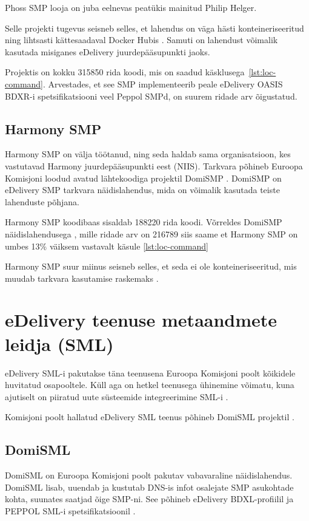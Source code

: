 Phoss SMP looja on juba eelnevas peatükis mainitud Philip Helger.

Selle projekti tugevus seisneb selles, et lahendus on väga hästi konteineriseeritud 
ning lihtsasti kättesaadaval Docker Hubis \cite{phelger_phoss_smp_xml_docker}. 
Samuti on lahendust võimalik kasutada misiganes eDelivery juurdepääsupunkti jaoks.

Projektis on kokku 315850 rida koodi, mis on saadud käsklusega~\ref{lst:loc-command}.
Arvestades, et see SMP implementeerib peale eDelivery OASIS BDXR-i spetsifikatsiooni 
veel Peppol SMPd, on suurem ridade arv õigustatud.

\subsection{Harmony SMP}\label{harmony-smp-analysis}
Harmony SMP \cite{niis_harmony_smp_repo} on välja töötanud, ning seda haldab sama organisatsioon, 
kes vastutavad Harmony juurdepääsupunkti eest (NIIS). Tarkvara põhineb Euroopa Komisjoni 
loodud avatud lähtekoodiga projektil DomiSMP \cite{niis_edelivery_components}. 
DomiSMP on eDelivery SMP tarkvara näidislahendus, mida on võimalik kasutada teiste lahenduste põhjana.

Harmony SMP koodibaas sisaldab 188220 rida koodi.
Võrreldes DomiSMP näidislahendusega \cite{ec_edelivery_smp_repo}, mille
ridade arv on 216789 siis saame et Harmony SMP on umbes
13\% väiksem vastavalt käsule \ref{lst:loc-command}  

Harmony SMP suur miinus seisneb selles, et seda ei ole konteineriseeritud, 
mis muudab tarkvara kasutamise raskemaks \cite{niis_harmony_common_repo}. 

\section{eDelivery teenuse metaandmete leidja (SML)}
\label{sml-components-analysis}
eDelivery SML-i pakutakse täna teenusena Euroopa Komisjoni poolt kõikidele huvitatud osapooltele. 
Küll aga on hetkel teenusega ühinemine võimatu, 
kuna ajutiselt on piiratud uute süsteemide integreerimine SML-i \cite{ec_edelivery_sml_service}.

Komisjoni poolt hallatud eDelivery SML teenus põhineb DomiSML projektil \cite{ec_edelivery_domisml_faq}.

\subsection{DomiSML}
DomiSML on Euroopa Komisjoni poolt pakutav vabavaraline näidislahendus.
DomiSML lisab, uuendab ja kustutab DNS-is infot osalejate SMP asukohtade kohta,
suunates saatjad õige SMP-ni. See põhineb eDelivery BDXL-profiilil 
ja PEPPOL SML-i spetsifikatsioonil \cite{ec_edelivery_domisml_faq} \cite{ec_edelivery_domisml_repo}.


